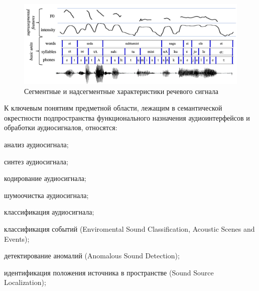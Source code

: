 \begin{figure}[H]
    \centerline{
        \includegraphics[scale=0.8, width=1.0\textwidth]{author/part4/figures/ch43_fig02_speech-structure-segment-suprasegment.png}
    }
    \caption{Сегментные и надсегментные характеристики речевого сигнала \cite{Okko2022}}
    \label{fig:speech-structure-segment-suprasegment}
\end{figure}

К ключевым понятиям предметной области, лежащим в семантической окрестности подпространства функционального назначения аудиоинтерфейсов и обработки аудиосигналов, относятся:
\begin{textitemize}    
    \item анализ аудиосигнала;
    \item синтез аудиосигнала;
    \item кодирование аудиосигнала;
    \item шумоочистка аудиосигнала;
    \item классификация аудиосигнала;
    \item классификация событий (Enviromental Sound Classification, Acoustic Scenes and Events);
    \item детектирование аномалий (Anomalous Sound Detection);
    \item идентификация положения источника в пространстве (Sound Source Localization);
\end{textitemize}

